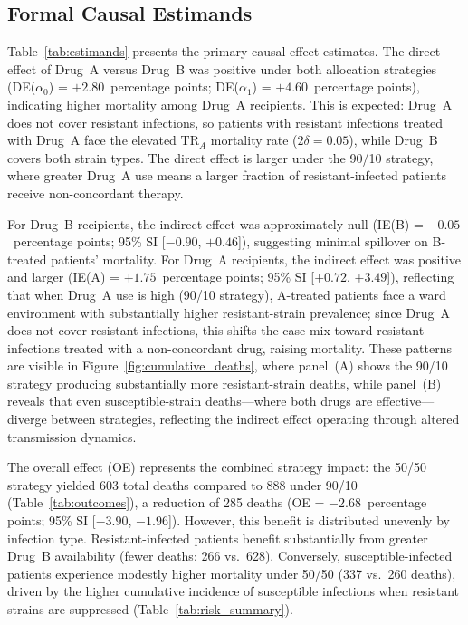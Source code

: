 \documentclass[preprint,11pt]{elsarticle}
\begin{document}
\subsection{Formal Causal Estimands}

Table~\ref{tab:estimands} presents the primary causal effect estimates. The direct effect of Drug~A versus Drug~B was positive under both allocation strategies (DE($\alpha_0$) = $+2.80$~percentage points; DE($\alpha_1$) = $+4.60$~percentage points), indicating higher mortality among Drug~A recipients. This is expected: Drug~A does not cover resistant infections, so patients with resistant infections treated with Drug~A face the elevated TR$_A$ mortality rate ($2\delta = 0.05$), while Drug~B covers both strain types. The direct effect is larger under the 90/10 strategy, where greater Drug~A use means a larger fraction of resistant-infected patients receive non-concordant therapy.

For Drug~B recipients, the indirect effect was approximately null (IE(B) = $-0.05$~percentage points; 95\% SI [$-0.90$, $+0.46$]), suggesting minimal spillover on B-treated patients' mortality. For Drug~A recipients, the indirect effect was positive and larger (IE(A) = $+1.75$~percentage points; 95\% SI [$+0.72$, $+3.49$]), reflecting that when Drug~A use is high (90/10 strategy), A-treated patients face a ward environment with substantially higher resistant-strain prevalence; since Drug~A does not cover resistant infections, this shifts the case mix toward resistant infections treated with a non-concordant drug, raising mortality. These patterns are visible in Figure~\ref{fig:cumulative_deaths}, where panel~(A) shows the 90/10 strategy producing substantially more resistant-strain deaths, while panel~(B) reveals that even susceptible-strain deaths---where both drugs are effective---diverge between strategies, reflecting the indirect effect operating through altered transmission dynamics.

The overall effect (OE) represents the combined strategy impact: the 50/50 strategy yielded 603 total deaths compared to 888 under 90/10 (Table~\ref{tab:outcomes}), a reduction of 285 deaths (OE = $-2.68$~percentage points; 95\% SI [$-3.90$, $-1.96$]). However, this benefit is distributed unevenly by infection type. Resistant-infected patients benefit substantially from greater Drug~B availability (fewer deaths: 266 vs.\ 628). Conversely, susceptible-infected patients experience modestly higher mortality under 50/50 (337 vs.\ 260 deaths), driven by the higher cumulative incidence of susceptible infections when resistant strains are suppressed (Table~\ref{tab:risk_summary}).
\end{document}

